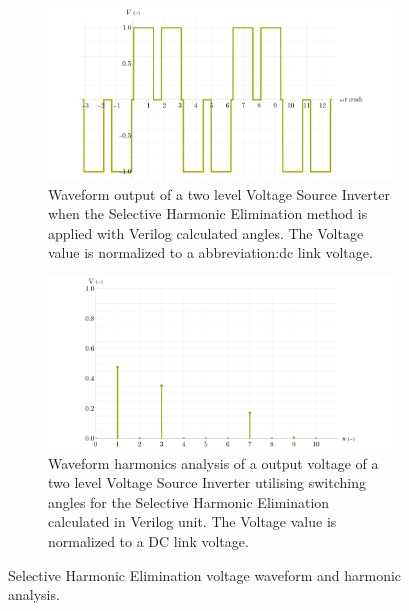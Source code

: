 \documentclass[a4paper, twoside, 11pt]{article}
\begin{document}
            \begin{figure}[htbp!]
                \centering
                \begin{subfigure}[t]{0.45\textwidth}
                    \includegraphics[width=1\textwidth]{src/png/VerilogPlotWaveform.png}
                    \caption{Waveform output of a two level Voltage Source Inverter when the Selective Harmonic Elimination method is applied with Verilog calculated angles. The Voltage value is normalized to a \gls{abbreviation:dc} link voltage.}
                    \label{fig:VerilogPlotWaveform}
                \end{subfigure}
                \hspace{0.05\textwidth}
                \begin{subfigure}[t]{0.45\textwidth}
                    \includegraphics[width=1\textwidth]{src/png/VerilogPlotHarmonics.png}
                    \caption{Waveform harmonics analysis of a output voltage of a two level Voltage Source Inverter utilising switching angles for the Selective Harmonic Elimination calculated in Verilog unit. The Voltage value is normalized to a DC link voltage.}
                    \label{fig:VerilogPlotHarmonics}
                \end{subfigure}
                \caption{Selective Harmonic Elimination voltage waveform and harmonic analysis.}
            \end{figure}
\end{document}
